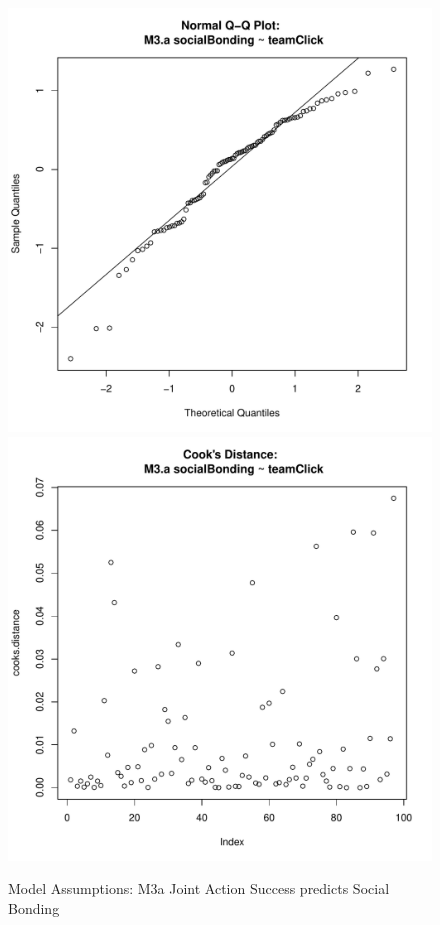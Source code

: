 \documentclass[12pt]{report}
\begin{document}
{\begin{figure}[htbp]
  \includegraphics[scale =.4]{../images/MLM3aQQNorm.pdf}
  \includegraphics[scale =.4]{../images/MLM3aCooksD.pdf}
  \caption{Model Assumptions: M3a Joint Action Success predicts Social Bonding}
  \label{fig:MLM3aAssumptions}
\end{figure}

}
\end{document}

